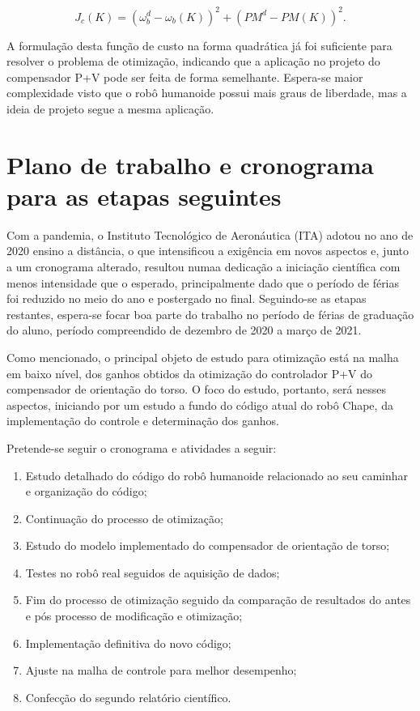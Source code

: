 \begin{equation}
\label{eq:ganhocorrente}
J_c(K) = (\omega_b^d - \omega_b(K))^2+(PM^d-PM(K))^2.
\end{equation}

A formulação desta função de custo na forma quadrática já foi suficiente para resolver o problema de otimização, indicando que a aplicação no projeto do compensador P+V pode ser feita de forma semelhante. Espera-se maior complexidade visto que o robô humanoide possui mais graus de liberdade, mas a ideia de projeto segue a mesma aplicação.

\section{Plano de trabalho e cronograma para as etapas seguintes}

Com a pandemia, o Instituto Tecnológico de Aeronáutica (ITA) adotou no ano de 2020 ensino a distância, o que intensificou a exigência em novos aspectos e, junto a um cronograma alterado, resultou numaa dedicação a iniciação científica com menos intensidade que o esperado, principalmente dado que o período de férias foi reduzido no meio do ano e postergado no final. Seguindo-se as etapas restantes, espera-se focar boa parte do trabalho no período de férias de graduação do aluno, período compreendido de dezembro de 2020 a março de 2021. 

Como mencionado, o principal objeto de estudo para otimização está na malha em baixo nível, dos ganhos obtidos da otimização do controlador P+V do compensador de orientação do torso. O foco do estudo, portanto, será nesses aspectos, iniciando por um estudo a fundo do código atual do robô Chape, da implementação do controle e determinação dos ganhos.

Pretende-se seguir o cronograma e atividades a seguir:

\begin{enumerate}[A]
\item{Estudo detalhado do código do robô humanoide relacionado ao seu caminhar e organização do código;}
\item{Continuação do processo de otimização;}
\item{Estudo do modelo implementado do compensador de orientação de torso;}
\item{Testes no robô real seguidos de aquisição de dados;}
\item{Fim do processo de otimização seguido da comparação de resultados do antes e pós processo de modificação e otimização;}
\item{Implementação definitiva do novo código;}
\item{Ajuste na malha de controle para melhor desempenho;}
\item{Confecção do segundo relatório científico.}
\end{enumerate}

